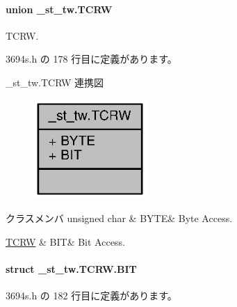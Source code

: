\paragraph{union \+\_\+st\+\_\+tw.\+T\+C\+R\+W}
T\+C\+R\+W. 

 3694s.\+h の 178 行目に定義があります。



\+\_\+st\+\_\+tw.\+T\+C\+R\+W 連携図
\nopagebreak
\begin{figure}[H]
\begin{center}
\leavevmode
\includegraphics[width=122pt]{dd/d07/union__st__tw_8TCRW__coll__graph}
\end{center}
\end{figure}
\begin{DoxyFields}{クラスメンバ}
unsigned char\label{3694s_8h_ae409eb2ba6eb6801f52763ae370c350e}
&
B\+Y\+T\+E&
Byte Access. \\
\hline

\hyperlink{3694s_8h_d2/dd5/struct__st__tw_8TCRW_8BIT}{T\+C\+R\+W}\label{3694s_8h_adb957fdc8000e1eef04a243f5199aa52}
&
B\+I\+T&
Bit Access. \\
\hline

\end{DoxyFields}
\label{struct__st__tw_8TCRW_8BIT}
\paragraph{struct \+\_\+st\+\_\+tw.\+T\+C\+R\+W.\+B\+I\+T}


 3694s.\+h の 182 行目に定義があります。



